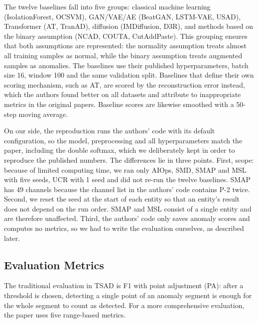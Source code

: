 \documentclass[sigconf,nonacm]{acmart}
\begin{document}
The twelve baselines fall into five groups: classical machine learning (IsolationForest, OCSVM), GAN/VAE/AE (BeatGAN, LSTM-VAE, USAD), Transformer (AT, TranAD), diffusion (IMDiffusion, D3R), and methods based on the binary assumption (NCAD, COUTA, CutAddPaste). This grouping ensures that both assumptions are represented: the normality assumption treats almost all training samples as normal, while the binary assumption treats augmented samples as anomalies. The baselines use their published hyperparameters, batch size 16, window 100 and the same validation split. Baselines that define their own scoring mechanism, such as AT, are scored by the reconstruction error instead, which the authors found better on all datasets and attribute to inappropriate metrics in the original papers. Baseline scores are likewise smoothed with a 50-step moving average.

On our side, the reproduction runs the authors' code with its default configuration, so the model, preprocessing and all hyperparameters match the paper, including the double softmax, which we deliberately kept in order to reproduce the published numbers. The differences lie in three points. First, scope: because of limited computing time, we ran only AIOps, SMD, SMAP and MSL with five seeds, UCR with 1 seed and did not re-run the twelve baselines. SMAP has 49 channels because the channel list in the authors' code contains P-2 twice. Second, we reset the seed at the start of each entity so that an entity's result does not depend on the run order. SMAP and MSL consist of a single entity and are therefore unaffected. Third, the authors' code only saves anomaly scores and computes no metrics, so we had to write the evaluation ourselves, as described later.

\subsection{Evaluation Metrics}
The traditional evaluation in TSAD is F1 with point adjustment (PA): after a threshold is chosen, detecting a single point of an anomaly segment is enough for the whole segment to count as detected. For a more comprehensive evaluation, the paper uses five range-based metrics.
\end{document}
